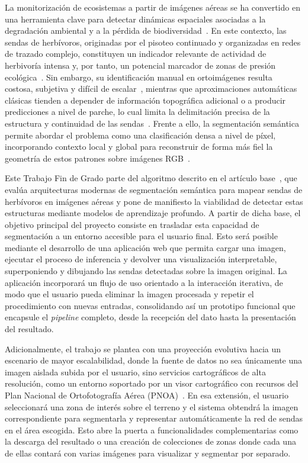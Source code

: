 
La monitorización de ecosistemas a partir de imágenes aéreas se ha convertido en una herramienta clave para detectar dinámicas espaciales asociadas a la degradación ambiental y a la pérdida de biodiversidad~\cite{turner2003remoteBiodiversity, pettorelli2014appliedEcologists, cavenderbares2022integratingRemoteSensing}. En este contexto, las sendas de herbívoros, originadas por el pisoteo continuado y organizadas en redes de trazado complejo, constituyen un indicador relevante de actividad de herbivoría intensa y, por tanto, un potencial marcador de zonas de presión ecológica~\cite{diezpastora2025trails}. Sin embargo, su identificación manual en ortoimágenes resulta costosa, subjetiva y difícil de escalar~\cite{pettorelli2014appliedEcologists, diezpastora2025trails}, mientras que aproximaciones automáticas clásicas tienden a depender de información topográfica adicional o a producir predicciones a nivel de parche, lo cual limita la delimitación precisa de la estructura y continuidad de las sendas~\cite{diezpastora2025trails}. Frente a ello, la segmentación semántica permite abordar el problema como una clasificación densa a nivel de píxel, incorporando contexto local y global para reconstruir de forma más fiel la geometría de estos patrones sobre imágenes RGB~\cite{long2015fcn, minaee2022segmentationSurvey}.

Este Trabajo Fin de Grado parte del algoritmo descrito en el artículo base~\cite{diezpastora2025trails}, que evalúa arquitecturas modernas de segmentación semántica para mapear sendas de herbívoros en imágenes aéreas y pone de manifiesto la viabilidad de detectar estas estructuras mediante modelos de aprendizaje profundo. A partir de dicha base, el objetivo principal del proyecto consiste en trasladar esta capacidad de segmentación a un entorno accesible para el usuario final. Esto será posible mediante el desarrollo de una aplicación web que permita cargar una imagen, ejecutar el proceso de inferencia y devolver una visualización interpretable, superponiendo y dibujando las sendas detectadas sobre la imagen original. La aplicación incorporará un flujo de uso orientado a la interacción iterativa, de modo que el usuario pueda eliminar la imagen procesada y repetir el procedimiento con nuevas entradas, consolidando así un prototipo funcional que encapsule el \textit{pipeline} completo, desde la recepción del dato hasta la presentación del resultado.

Adicionalmente, el trabajo se plantea con una proyección evolutiva hacia un escenario de mayor escalabilidad, donde la fuente de datos no sea únicamente una imagen aislada subida por el usuario, sino servicios cartográficos de alta resolución, como un entorno soportado por un visor cartográfico con recursos del Plan Nacional de Ortofotografía Aérea (PNOA)~\cite{pnoa_ign}. En esa extensión, el usuario seleccionará una zona de interés sobre el terreno y el sistema obtendrá la imagen correspondiente para segmentarla y representar automáticamente la red de sendas en el área escogida. Esto abre la puerta a funcionalidades complementarias como la descarga del resultado o una creación de colecciones de zonas donde cada una de ellas contará con varias imágenes para visualizar y segmentar por separado.


